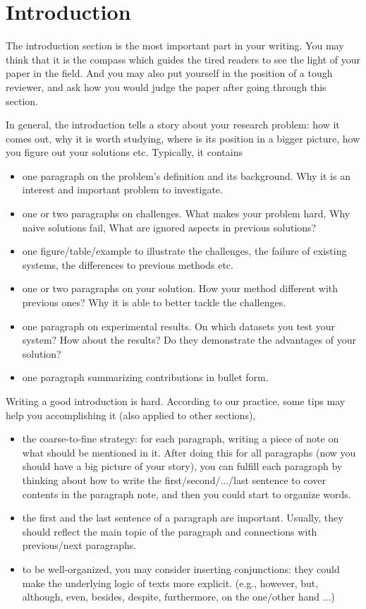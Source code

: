 \section{Introduction}

The introduction section is the most important part in your writing.
You may think that it is the compass which guides the tired readers to 
see the light of your paper in the field.
And you may also put yourself in the position of a tough reviewer,
and ask how you would judge the paper after going through this section.

In general, the introduction tells a story about your research problem: 
how it comes out, why it is worth studying, 
where is its position in a bigger picture,
how you figure out your solutions etc.
Typically, it contains
\begin{itemize}
    \item one paragraph on the problem's definition and its background. 
     Why it is an interest and important problem to investigate.
    \item one or two paragraphs on challenges. 
     What makes your problem hard,
     Why naive solutions fail,
     What are ignored aspects in previous solutions?
    \item one figure/table/example to illustrate the challenges, 
    the failure of existing systems,
    the differences to previous methods etc.
    \item one or two paragraphs on your solution. 
     How your method different with previous ones?
     Why it is able to better tackle the challenges.
    \item one paragraph on experimental results. 
     On which datasets you test your system?
     How about the results? 
     Do they demonstrate the advantages of your solution?
    \item one paragraph summarizing contributions in bullet form.
\end{itemize}


Writing a good introduction is hard. 
According to our practice, some tips may help you accomplishing it
(also applied to other sections),
\begin{itemize}
    \item the coarse-to-fine strategy: 
    for each paragraph, writing a piece of note on what should be mentioned in it. 
    After doing this for all paragraphs 
    (now you should have a big picture of your story), 
    you can fulfill each paragraph by thinking about how to write 
    the first/second/.../last sentence to cover contents in the paragraph note,
    and then you could start to organize words.
    \item the first and the last sentence of a paragraph are important.
    Usually, they should reflect the main topic of the paragraph and connections
    with previous/next paragraphs.
    \item to be well-organized, you may consider inserting conjunctions:
    they could make the underlying logic of texts more explicit.
    (e.g., however, but, although, even, besides, despite, furthermore,
    on the one/other hand ...)
\end{itemize}


